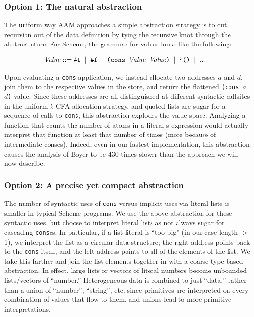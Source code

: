 \documentclass[preprint,onecolumn,9pt]{sigplanconf} %
\begin{document}
\subsubsection{Option 1: The natural abstraction}

The uniform way AAM approaches a simple abstraction strategy is to cut
recursion out of the data definition by tying the recursive knot
through the abstract store. For Scheme, the grammar for values looks
like the following:

\newcommand{\alt}{\;\mid\;}
\begin{align*}
\Value &::= \mbox{{\tt \#t}} \alt \mbox{{\tt \#f}} \alt \mbox{{\tt(cons $\Value$ $\Value$)}} \alt \mbox{{\tt '()}} \alt ...
\end{align*}

Upon evaluating a {\tt cons} application, we instead allocate two
addresses $a$ and $d$, join them to the respective values in the
store, and return the flattened {\tt (cons $a$ $d$)} value. Since
these addresses are all distinguished at different syntactic callsites
in the uniform $k$-CFA allocation strategy, and quoted lists are sugar
for a sequence of calls to {\tt cons}, this abstraction explodes the
value space. Analyzing a function that counts the number of atoms in a
literal s-expression would actually interpret that function at least
that number of times (more because of intermediate conses). Indeed,
even in our fastest implementation, this abstraction causes the
analysis of Boyer to be 430 times slower than the approach we will now
describe.

\subsubsection{Option 2: A precise yet compact abstraction}

The number of syntactic uses of {\tt cons} versus implicit uses via
literal lists is smaller in typical Scheme programs. We use the above
abstraction for these syntactic uses, but choose to interpret literal
lists as not always sugar for cascading {\tt cons}es. In particular,
if a list literal is ``too big'' (in our case length $>$ 1), we
interpret the list as a circular data structure; the right address
points back to the {\tt cons} itself, and the left address points to
all of the elements of the list. We take this farther and join the
list elements together in with a coarse type-based abstraction. In
effect, large lists or vectors of literal numbers become unbounded
lists/vectors of ``number.'' Heterogeneous data is combined to just
``data,'' rather than a union of ``number'', ``string'', etc. since
primitives are interpreted on every combination of values that flow to
them, and unions lead to more primitive interpretations.
\end{document}
